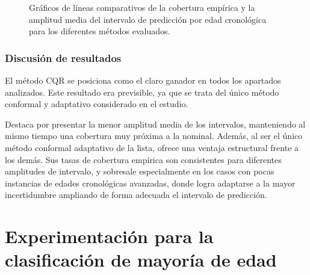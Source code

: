 \begin{figure}[htbp]
    \caption[
        Gráficos de líneas comparativos de la cobertura empírica y la amplitud media del intervalo de predicción por edad cronológica para los diferentes métodos evaluados.
    ]{
        Gráficos de líneas comparativos de la cobertura empírica y la amplitud media del intervalo de predicción por edad cronológica para los diferentes métodos evaluados.
    }
    \label{fig:AE_EC_MPIW_by_true_age}
\end{figure}


\subsubsection{Discusión de resultados}

El método CQR se posiciona como el claro ganador en todos los apartados analizados. Este resultado era previsible, ya que se trata del único método conformal y adaptativo considerado en el estudio.

Destaca por presentar la menor amplitud media de los intervalos, manteniendo al mismo tiempo una cobertura muy próxima a la nominal. Además, al ser el único método conformal adaptativo de la lista, ofrece una ventaja estructural frente a los demás. Sus tasas de cobertura empírica son consistentes para diferentes amplitudes de intervalo, y sobresale especialmente en los casos con pocas instancias de edades cronológicas avanzadas, donde logra adaptarse a la mayor incertidumbre ampliando de forma adecuada el intervalo de predicción.

\FloatBarrier






\section{Experimentación para la clasificación de mayoría de edad}

